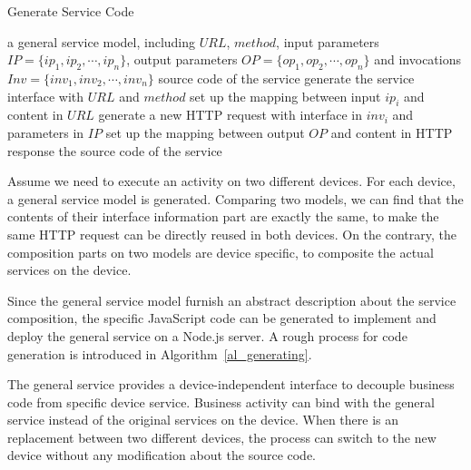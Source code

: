  \begin{algorithm}
        \caption{Generate Service Code}
        \begin{algorithmic}[1] 
            \Require a general service model, including $URL$, $method$, input parameters $IP = \{ ip_1, ip_2,\cdots,ip_n\}$, output parameters $OP = \{ op_1, op_2,\cdots,op_n\}$ and invocations $Inv = \{ inv_1, inv_2,\cdots,inv_n\}$
            \Ensure source code of the service
            \State generate the service interface with $URL$ and $method$
            		\State set up the mapping between input $ip_i$ and content in $URL$
            \EndFor
            		\State generate a new HTTP request with interface in $inv_i$ and parameters in $IP$
            		\State set up the mapping between output $OP$ and content in HTTP response
            \EndFor
            \State
            \Return the source code of the service
        \end{algorithmic}
        \label{al_generating}
 \end{algorithm}
 
Assume we need to execute an activity on two different devices. For each device, a general service model is generated. Comparing two models, we can find that the contents of their interface information part are exactly the same, to make the same HTTP request can be directly reused in both devices. On the contrary, the composition parts on two models are device specific, to composite the actual services on the device. 

Since the general service model furnish an abstract description about the service composition, the specific JavaScript code can be generated to implement and deploy the general service on a Node.js server\cite{wotframework}. A rough process for code generation is introduced in Algorithm~\ref{al_generating}. 

The general service provides a device-independent interface to decouple business code from specific device service. Business activity can bind with the general service instead of the original services on the device. When there is an replacement between two different devices, the process can switch to the new device without any modification about the source code. 



